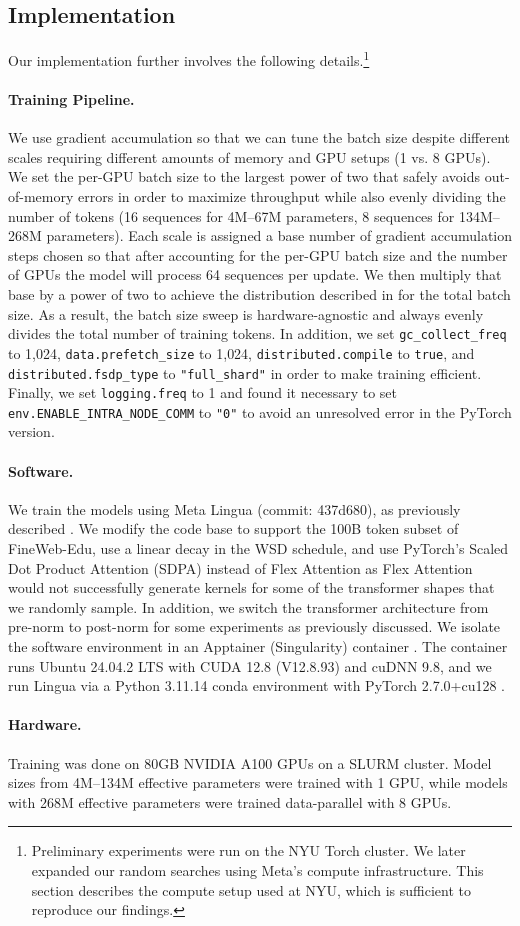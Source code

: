 \subsection{Implementation}
\label{app:experimental-design:implementation}

Our implementation further involves the following details.\footnote{
    Preliminary experiments were run on the NYU Torch cluster. We later expanded our random searches using Meta's compute infrastructure. This section describes the compute setup used at NYU, which is sufficient to reproduce our findings.
}

\paragraph{Training Pipeline.} We use gradient accumulation so that we can tune the batch size despite different scales requiring different amounts of memory and GPU setups (1 vs. 8 GPUs). We set the per-GPU batch size to the largest power of two that safely avoids out-of-memory errors in order to maximize throughput while also evenly dividing the number of tokens (16 sequences for 4M--67M parameters, 8 sequences for 134M--268M parameters). Each scale is assigned a base number of gradient accumulation steps chosen so that after accounting for the per-GPU batch size and the number of GPUs the model will process 64 sequences per update. We then multiply that base by a power of two to achieve the distribution described in  for the total batch size. As a result, the batch size sweep is hardware-agnostic and always evenly divides the total number of training tokens. In addition, we set \texttt{gc\_collect\_freq} to 1{,}024, \texttt{data.prefetch\_size} to 1{,}024, \texttt{distributed.compile} to \texttt{true}, and \texttt{distributed.fsdp\_type} to \texttt{"full\_shard"} in order to make training efficient. Finally, we set \texttt{logging.freq} to 1 and found it necessary to set \texttt{env.ENABLE\_INTRA\_NODE\_COMM} to \texttt{"0"} to avoid an unresolved error in the PyTorch version.

\paragraph{Software.} We train the models using Meta Lingua (commit: 437d680), as previously described \citep{meta-lingua}. We modify the code base to support the 100B token subset of FineWeb-Edu, use a linear decay in the WSD schedule, and use PyTorch's Scaled Dot Product Attention (SDPA) instead of Flex Attention as Flex Attention would not successfully generate kernels for some of the transformer shapes that we randomly sample. In addition, we switch the transformer architecture from pre-norm to post-norm for some experiments as previously discussed. We isolate the software environment in an Apptainer (Singularity) container \citep{singularity2021}. The container runs Ubuntu 24.04.2 LTS with CUDA 12.8 (V12.8.93) and cuDNN 9.8, and we run Lingua via a Python 3.11.14 conda environment with PyTorch 2.7.0+cu128 \citep{Paszke2019PyTorch}.

\paragraph{Hardware.} Training was done on 80GB NVIDIA A100 GPUs on a SLURM cluster. Model sizes from 4M--134M effective parameters were trained with 1 GPU, while models with 268M effective parameters were trained data-parallel with 8 GPUs.


